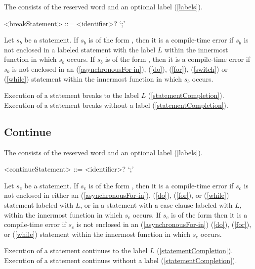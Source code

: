 \documentclass[makeidx]{article}
\begin{document}
{\LMHash{}%
The  consists of the reserved word \BREAK{} and an optional label (\ref{labels}).

\begin{grammar}
<breakStatement> ::= \BREAK{} <identifier>? `;'
\end{grammar}

\LMHash{}%
Let $s_b$ be a \BREAK{} statement.
If $s_b$ is of the form ,
then it is a compile-time error if $s_b$ is not enclosed in a labeled statement
with the label $L$ within the innermost function in which $s_b$ occurs.
If $s_b$ is of the form \code{\BREAK{};},
then it is a compile-time error if $s_b$ is not enclosed in an
\code{\AWAIT{} \FOR{}} (\ref{asynchronousFor-in}),
\DO{} (\ref{do}), \FOR{} (\ref{for}), \SWITCH{} (\ref{switch})
or \WHILE{} (\ref{while}) statement within the innermost function in which $s_b$ occurs.

\LMHash{}%
Execution of a \BREAK{} statement  breaks to the label $L$ (\ref{statementCompletion}).
Execution of a \BREAK{} statement \code{\BREAK{};} breaks without a label (\ref{statementCompletion}).


\subsection{Continue}

\LMHash{}%
The  consists of the reserved word \CONTINUE{} and an optional label (\ref{labels}).

\begin{grammar}
<continueStatement> ::= \CONTINUE{} <identifier>? `;'
\end{grammar}

\LMHash{}%
Let $s_c$ be a \CONTINUE{} statement.
If $s_c$ is of the form ,
then it is a compile-time error if $s_c$ is not enclosed in either an
\code{\AWAIT{} \FOR{}} (\ref{asynchronousFor-in}),
\DO{} (\ref{do}), \FOR{} (\ref{for}), or \WHILE{} (\ref{while})
statement labeled with $L$, or in a \SWITCH{} statement with a case clause
labeled with $L$, within the innermost function in which $s_c$ occurs.
If $s_c$ is of the form \code{\CONTINUE{};}
then it is a compile-time error if $s_c$ is not enclosed in an
\code{\AWAIT{} \FOR{}} (\ref{asynchronousFor-in})
\DO{} (\ref{do}), \FOR{} (\ref{for}), or \WHILE{} (\ref{while}) statement
within the innermost function in which $s_c$ occurs.

\LMHash{}%
Execution of a \CONTINUE{} statement  continues to the label $L$ (\ref{statementCompletion}).
Execution of a \CONTINUE{} statement \code{\CONTINUE{};} continues without a label (\ref{statementCompletion}).


}
\end{document}
